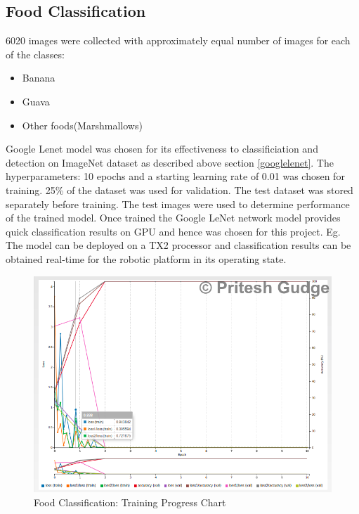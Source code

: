 \documentclass[10pt,journal,compsoc]{IEEEtran}
\begin{document}
\subsection{Food Classification}
6020 images were collected with approximately equal number of images for each of the classes:
\begin{itemize}
\item Banana
\item Guava
\item Other foods(Marshmallows)
\end {itemize}
Google Lenet\cite{DBLP} model was chosen for its effectiveness to classificiation and detection on ImageNet dataset as described above section \ref{googlelenet}. The hyperparameters: 10 epochs and a starting learning rate of 0.01 was chosen for training. 25\% of the dataset was used for validation. The test dataset was stored separately before training. The test images were used to determine performance of the trained model. Once trained the Google LeNet network model provides quick classification results on GPU and hence was chosen for this project. Eg. The model can be deployed on a TX2 processor and classification  results can be obtained real-time for the robotic platform in its operating state.

\begin{figure}[thpb]
      \centering
      \includegraphics[width=\linewidth]{images/training_chart}
      \caption{Food Classification: Training Progress Chart}
      \label{fig:food_class1}
\end{figure}

%
\end{document}
